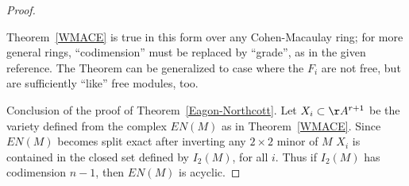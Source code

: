 \begin{proof}
\begin{fact}
Theorem~\ref{WMACE} is true in this form over any Cohen-Macaulay ring; for more general
rings, ``codimension'' must be replaced by ``grade'', as in the given reference.
The Theorem can be generalized
to case where the $F_i$ are not free, but are sufficiently ``like'' free modules, too.
\end{fact}

Conclusion of the proof of Theorem~\ref{Eagon-Northcott}.
Let $X_{i}\subset \AA^{r+1}$ be the variety defined from the complex $EN(M)$ as in 
Theorem~\ref{WMACE}. Since $EN(M)$ becomes split exact after inverting any $2\times 2$ minor of $M$
$X_{i}$ is
contained in the closed set defined by $I_{2}(M)$, for all $i$. Thus if $I_{2}(M)$ has codimension $n-1$,
then $EN(M)$ is acyclic. 
\end {proof}

